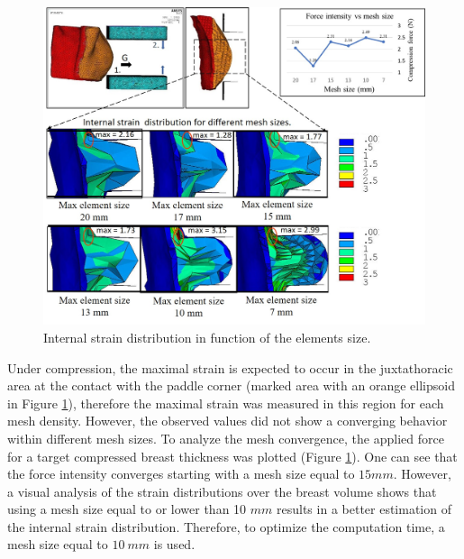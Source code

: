 \begin{figure}[!h]
\centering
\includegraphics[width=\textwidth,keepaspectratio]{figures/meshConvergence.jpg} 
\caption{Internal strain distribution in function of the elements size. }\label{fig:meshconvergence}
\end{figure}

Under compression, the maximal strain is expected to occur in the juxtathoracic area at the contact with the paddle corner (marked area with an orange ellipsoid in Figure \ref{fig:meshconvergence}), therefore the maximal strain was measured in this region for each mesh density. However, the observed values did not show a converging behavior within different mesh sizes. To analyze the mesh convergence, the applied force for a target compressed breast thickness was plotted (Figure \ref{fig:meshconvergence}). One can see that the force intensity converges starting with a mesh size equal to $15mm$. However, a visual analysis of the strain distributions over the breast volume shows that using a mesh size equal to or lower than 10 $mm$ results in a better estimation of the internal strain distribution. Therefore, to optimize the computation time, a mesh size equal to $10\ mm$ is used.
